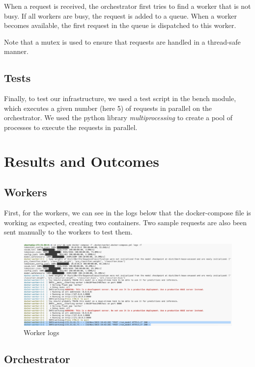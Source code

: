 \documentclass[letterpaper,headings=standardclasses,parskip=half]{scrartcl}
\begin{document}
When a request is received, the orchestrator first tries to find a worker that is not busy. If all workers are busy, the request is added to a queue. When a worker becomes available, the first request in the queue is dispatched to this worker.

Note that a mutex is used to ensure that requests are handled in a thread-safe manner.

\subsection{Tests}

Finally, to test our infrastructure, we used a test script in the bench module, which executes a given number (here 5) of requests in parallel on the orchestrator. We used the python library \emph{multiprocessing} to create a pool of processes to execute the requests in parallel.

\section{Results and Outcomes}

\subsection{Workers}

First, for the workers, we can see in the logs below that the docker-compose file is working as expected, creating two containers. Two sample requests are also been sent manually to the workers to test them.

\begin{figure}[H]
    \centering
    \includegraphics[width=\textwidth]{images/worker.png}
    \caption{Worker logs}
    \label{fig:worker}
\end{figure}

\subsection{Orchestrator}
\end{document}
